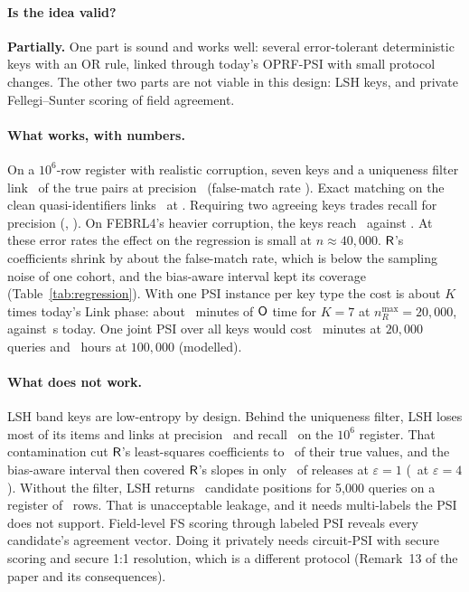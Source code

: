 \paragraph{Is the idea valid?} \textbf{Partially.} One part is sound and works well: several error-tolerant deterministic keys with an OR rule, linked through today's OPRF-PSI with small protocol changes. The other two parts are not viable in this design: LSH keys, and private Fellegi--Sunter scoring of field agreement.

\paragraph{What works, with numbers.} On a $10^6$-row register with realistic corruption, seven keys and a uniqueness filter link \MKrec\ of the true pairs at precision \MKprec\ (false-match rate \MKfalse). Exact matching on the clean quasi-identifiers links \EXrec\ at \EXprec. Requiring two agreeing keys trades recall for precision (\MKtworec, \MKtwoprec). On FEBRL4's heavier corruption, the keys reach \FBmkrec\ against \FBexrec. At these error rates the effect on the regression is small at $n\approx40{,}000$. $\mathsf{R}$'s coefficients shrink by about the false-match rate, which is below the sampling noise of one cohort, and the bias-aware interval kept its coverage (Table~\ref{tab:regression}). With one PSI instance per key type the cost is about $K$ times today's Link phase: about \CostPerSeven\ minutes of $\mathsf{O}$ time for $K=7$ at $n_R^{\max}=20{,}000$, against \CostBase\,s today. One joint PSI over all keys would cost \CostJointSeven\ minutes at $20{,}000$ queries and \CostJointSevenBig\ hours at $100{,}000$ (modelled).

\paragraph{What does not work.} LSH band keys are low-entropy by design. Behind the uniqueness filter, LSH loses most of its items and links at precision \LSHprec\ and recall \LSHrec\ on the $10^6$ register. That contamination cut $\mathsf{R}$'s least-squares coefficients to \LSHratioR\ of their true values, and the bias-aware interval then covered $\mathsf{R}$'s slopes in only \LSHcovR\ of releases at $\varepsilon=1$ (\LSHcovRfour\ at $\varepsilon=4$). Without the filter, LSH returns \LSHmultiCand\ candidate positions for 5{,}000 queries on a register of \LSHmultiN\ rows. That is unacceptable leakage, and it needs multi-labels the PSI does not support. Field-level FS scoring through labeled PSI reveals every candidate's agreement vector. Doing it privately needs circuit-PSI with secure scoring and secure 1:1 resolution, which is a different protocol (Remark~13 of the paper and its consequences).


